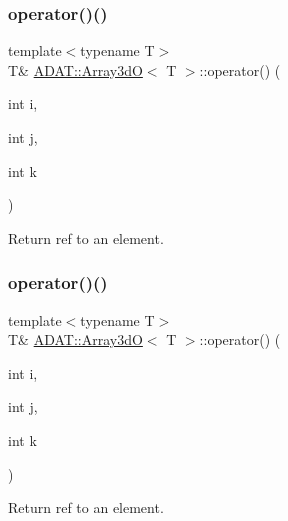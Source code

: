 \subsubsection{\texorpdfstring{operator()()}{operator()()}\hspace{0.1cm}{\footnotesize\ttfamily [2/6]}}
{\footnotesize\ttfamily template$<$typename T$>$ \\
T\& \mbox{\hyperlink{classADAT_1_1Array3dO}{A\+D\+A\+T\+::\+Array3dO}}$<$ T $>$\+::operator() (\begin{DoxyParamCaption}\item[{int}]{i,  }\item[{int}]{j,  }\item[{int}]{k }\end{DoxyParamCaption})\hspace{0.3cm}{\ttfamily [inline]}}



Return ref to an element. 

\mbox{\label{classADAT_1_1Array3dO_a7707d5d50d59bd04eb784754e2128075}} 
\subsubsection{\texorpdfstring{operator()()}{operator()()}\hspace{0.1cm}{\footnotesize\ttfamily [3/6]}}
{\footnotesize\ttfamily template$<$typename T$>$ \\
T\& \mbox{\hyperlink{classADAT_1_1Array3dO}{A\+D\+A\+T\+::\+Array3dO}}$<$ T $>$\+::operator() (\begin{DoxyParamCaption}\item[{int}]{i,  }\item[{int}]{j,  }\item[{int}]{k }\end{DoxyParamCaption})\hspace{0.3cm}{\ttfamily [inline]}}



Return ref to an element. 

\mbox{\label{classADAT_1_1Array3dO_a3b4254a3812d8a02c4510f4fa635dd9c}} 
